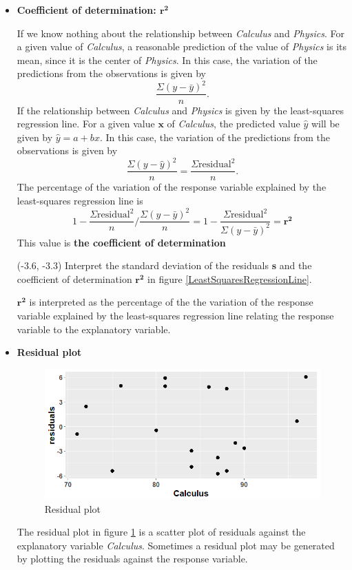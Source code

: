 \documentclass[a4paper, 12pt,twoside]{book}
\begin{document}
\begin{itemize}
\begin{itemize}[leftmargin = 0cm]
\item \textbf{Coefficient of determination: $\mathbf{r^2}$}\vspace{0.3cm}

If we know nothing about the relationship between \textit{Calculus} and \textit{Physics}. For a given value of \textit{Calculus}, a reasonable prediction of the value of \textit{Physics} is its mean, since it is the center of \textit{Physics}. In this case, the variation of the predictions from the observations is given by 
$$\frac{\Sigma(y-\bar{y})^2}{n}.$$
If the relationship between \textit{Calculus} and \textit{Physics} is given by the least-squares regression line. For a given value $\mathbf{x}$ of \textit{Calculus}, the predicted value $\hat{y}$ will be given by $\hat{y} = a + bx$. In this case, the variation of the predictions from the observations is given by 
$$\frac{\Sigma(y-\hat{y})^2}{n} = \frac{\Sigma\text{residual}^2}{n} .$$
The percentage of the variation of the response variable explained by the least-squares regression line is $$1-\frac{\Sigma\text{residual}^2}{n}\Bigg/\frac{\Sigma(y-\bar{y})^2}{n}= 1- \frac{\Sigma\text{residual}^2}{\Sigma(y-\bar{y})^2}= \mathbf{r^2} $$
This value is \textbf{the coefficient of determination}\vspace{0.3cm}

\begin{textblock}{4.6}(-3.6, -3.3)
Interpret the standard deviation of the residuals \textbf{s} and the coefficient of determination $\mathbf{r^2}$ in figure \ref{LeastSquaresRegressionLine}.
\end{textblock}

\colorbox{babypink}{\parbox{13.2cm}{$\mathbf{r^2}$ is interpreted as the percentage of the the variation of the response variable explained by the least-squares regression line relating the response variable to the explanatory variable.}}
\vspace{0.6cm}
\newpage

\item \textbf{Residual plot}

\begin{figure}[H]
\centering
\includegraphics[scale=0.5]{ResidualPlot.png}
\caption{Residual plot}
\label{ResidualPlot}
\end{figure}
The residual plot in figure \ref{ResidualPlot} is a scatter plot of residuals against the explanatory variable \textit{Calculus}. Sometimes a residual plot may be generated by plotting the residuals against the response variable.\vspace{0.3cm}


\end{itemize}
\end{itemize}
\end{document}
